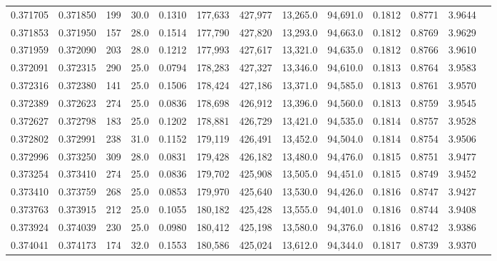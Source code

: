 \begin{tabular}{rrrrrrrrrrrrr}
0.371705 & 0.371850 &   199 & 30.0 &                                     0.1310 & 177,633 & 427,977 &  13,265.0 &  94,691.0 & 0.1812 & 0.8771 & 3.9644 \\
0.371853 & 0.371950 &   157 & 28.0 &                                     0.1514 & 177,790 & 427,820 &  13,293.0 &  94,663.0 & 0.1812 & 0.8769 & 3.9629 \\
0.371959 & 0.372090 &   203 & 28.0 &                                     0.1212 & 177,993 & 427,617 &  13,321.0 &  94,635.0 & 0.1812 & 0.8766 & 3.9610 \\
0.372091 & 0.372315 &   290 & 25.0 &                                     0.0794 & 178,283 & 427,327 &  13,346.0 &  94,610.0 & 0.1813 & 0.8764 & 3.9583 \\
0.372316 & 0.372380 &   141 & 25.0 &                                     0.1506 & 178,424 & 427,186 &  13,371.0 &  94,585.0 & 0.1813 & 0.8761 & 3.9570 \\
0.372389 & 0.372623 &   274 & 25.0 &                                     0.0836 & 178,698 & 426,912 &  13,396.0 &  94,560.0 & 0.1813 & 0.8759 & 3.9545 \\
0.372627 & 0.372798 &   183 & 25.0 &                                     0.1202 & 178,881 & 426,729 &  13,421.0 &  94,535.0 & 0.1814 & 0.8757 & 3.9528 \\
0.372802 & 0.372991 &   238 & 31.0 &                                     0.1152 & 179,119 & 426,491 &  13,452.0 &  94,504.0 & 0.1814 & 0.8754 & 3.9506 \\
0.372996 & 0.373250 &   309 & 28.0 &                                     0.0831 & 179,428 & 426,182 &  13,480.0 &  94,476.0 & 0.1815 & 0.8751 & 3.9477 \\
0.373254 & 0.373410 &   274 & 25.0 &                                     0.0836 & 179,702 & 425,908 &  13,505.0 &  94,451.0 & 0.1815 & 0.8749 & 3.9452 \\
0.373410 & 0.373759 &   268 & 25.0 &                                     0.0853 & 179,970 & 425,640 &  13,530.0 &  94,426.0 & 0.1816 & 0.8747 & 3.9427 \\
0.373763 & 0.373915 &   212 & 25.0 &                                     0.1055 & 180,182 & 425,428 &  13,555.0 &  94,401.0 & 0.1816 & 0.8744 & 3.9408 \\
0.373924 & 0.374039 &   230 & 25.0 &                                     0.0980 & 180,412 & 425,198 &  13,580.0 &  94,376.0 & 0.1816 & 0.8742 & 3.9386 \\
0.374041 & 0.374173 &   174 & 32.0 &                                     0.1553 & 180,586 & 425,024 &  13,612.0 &  94,344.0 & 0.1817 & 0.8739 & 3.9370 \\

\end{tabular}
